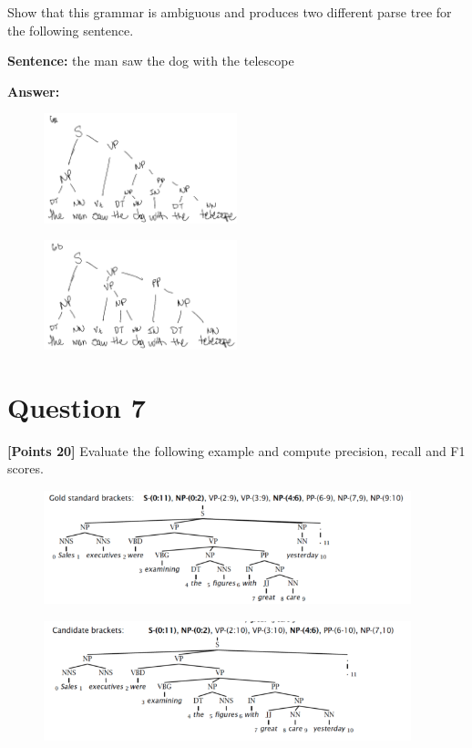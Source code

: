 \documentclass[12pt]{article}
\begin{document}
Show that this grammar is ambiguous and produces two different parse tree for
the following sentence.

\textbf{Sentence:} the man saw the dog with the telescope

\textbf{Answer:}

\begin{figure}[!ht]
      \centering
      \includegraphics[width=0.5\textwidth]{assets/test2/p6a.png}
\end{figure}

\begin{figure}[!ht]
      \centering
      \includegraphics[width=0.5\textwidth]{assets/test2/p6b.png}
\end{figure}

\newpage
\section*{Question 7}
\textbf{[Points 20]} Evaluate the following example and compute precision,
recall and F1 scores.

\begin{figure}[!ht]
      \centering
      \includegraphics[width=0.95\textwidth]{assets/test2/gold_standard_brackets.png}
\end{figure}

\begin{figure}[!ht]
      \centering
      \includegraphics[width=0.95\textwidth]{assets/test2/candidate_brackets.png}
\end{figure}
\end{document}
